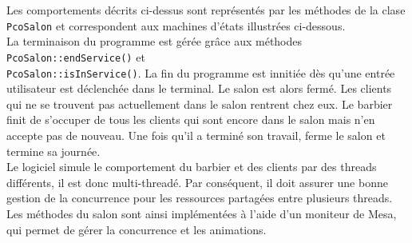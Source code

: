 \documentclass{article}
\begin{document}
Les comportements décrits ci-dessus sont représentés par les méthodes de la clase \texttt{PcoSalon} et correspondent aux machines d'états
illustrées ci-dessous. \\

La terminaison du programme est gérée grâce aux méthodes \texttt{PcoSalon::endService()} et \\ \texttt{PcoSalon::isInService()}.
La fin du programme
est innitiée dès qu'une entrée utilisateur est déclenchée dans le terminal. Le salon est alors fermé. Les clients qui ne se trouvent pas
actuellement dans le salon rentrent chez eux. Le barbier finit de s'occuper de tous les clients qui sont encore dans le salon mais n'en
accepte pas de nouveau. Une fois qu'il a terminé son travail, ferme le salon et termine sa journée. \\

Le logiciel simule le comportement du barbier et des clients par des threads différents, il est donc multi-threadé. Par conséquent, il doit 
assurer une bonne gestion de la concurrence pour les ressources partagées entre plusieurs threads. Les méthodes du salon sont ainsi implémentées 
à l'aide d'un moniteur de Mesa, qui permet de gérer la concurrence et les animations. 
\end{document}
